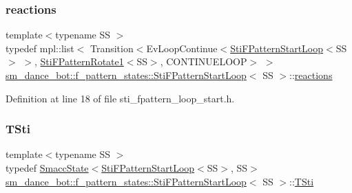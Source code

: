 \subsubsection{\texorpdfstring{reactions}{reactions}}
{\footnotesize\ttfamily template$<$typename SS $>$ \\
typedef mpl\+::list$<$ Transition$<$Ev\+Loop\+Continue$<$\hyperlink{structsm__dance__bot_1_1f__pattern__states_1_1StiFPatternStartLoop}{Sti\+F\+Pattern\+Start\+Loop}$<$SS$>$ $>$, \hyperlink{structsm__dance__bot_1_1f__pattern__states_1_1StiFPatternRotate1}{Sti\+F\+Pattern\+Rotate1}$<$SS$>$, C\+O\+N\+T\+I\+N\+U\+E\+L\+O\+OP$>$ $>$ \hyperlink{structsm__dance__bot_1_1f__pattern__states_1_1StiFPatternStartLoop}{sm\+\_\+dance\+\_\+bot\+::f\+\_\+pattern\+\_\+states\+::\+Sti\+F\+Pattern\+Start\+Loop}$<$ SS $>$\+::\hyperlink{structsm__dance__bot_1_1f__pattern__states_1_1StiFPatternStartLoop_ab410fb656e621c3ce2ee7bb0bb11eae2}{reactions}}



Definition at line 18 of file sti\+\_\+fpattern\+\_\+loop\+\_\+start.\+h.

\mbox{\label{structsm__dance__bot_1_1f__pattern__states_1_1StiFPatternStartLoop_a18f1bcdd4f45d9230c9b23b6153ae9e2}} 
\subsubsection{\texorpdfstring{T\+Sti}{TSti}}
{\footnotesize\ttfamily template$<$typename SS $>$ \\
typedef \hyperlink{classSmaccState}{Smacc\+State}$<$\hyperlink{structsm__dance__bot_1_1f__pattern__states_1_1StiFPatternStartLoop}{Sti\+F\+Pattern\+Start\+Loop}$<$SS$>$, SS$>$ \hyperlink{structsm__dance__bot_1_1f__pattern__states_1_1StiFPatternStartLoop}{sm\+\_\+dance\+\_\+bot\+::f\+\_\+pattern\+\_\+states\+::\+Sti\+F\+Pattern\+Start\+Loop}$<$ SS $>$\+::\hyperlink{structsm__dance__bot_1_1f__pattern__states_1_1StiFPatternStartLoop_a18f1bcdd4f45d9230c9b23b6153ae9e2}{T\+Sti}}



